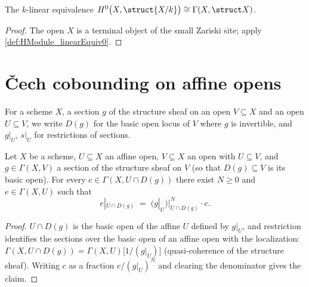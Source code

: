\begin{definition}
  \label{def:moduleKSheafHZero}
  \leanok
  The \(k\)-linear equivalence \(H^0\bigl(X, \struct{X/k}\bigr) \cong \Gamma(X, \struct X)\).
\end{definition}
\begin{proof}
  \leanok
  The open \(X\) is a terminal object of the small Zariski site; apply
  \ref{def:HModule_linearEquiv0}.
\end{proof}

\section{\v{C}ech cobounding on affine opens}

For a scheme \(X\), a section \(g\) of the structure sheaf on an open \(V \subseteq X\) and
an open \(U \subseteq V\), we write \(D(g)\) for the basic open locus of \(V\) where \(g\) is
invertible, and \(g|_U\), \(s|_U\) for restrictions of sections.

\begin{lemma}
  \label{lem:denominator_clearing}
  \leanok
  Let \(X\) be a scheme, \(U \subseteq X\) an affine open, \(V \subseteq X\) an open with
  \(U \subseteq V\), and \(g \in \Gamma(X, V)\) a section of the structure sheaf on \(V\) (so
  that \(D(g) \subseteq V\) is its basic open). For every \(c \in \Gamma(X, U \cap D(g))\)
  there exist \(N \ge 0\) and \(e \in \Gamma(X, U)\) such that
  \[
    e|_{U \cap D(g)} \;=\; \bigl(g|_{U}\bigr)|_{U \cap D(g)}^{N} \cdot c .
  \]
\end{lemma}
\begin{proof}
  \leanok
  \(U \cap D(g)\) is the basic open of the affine \(U\) defined by \(g|_U\), and restriction
  identifies the sections over the basic open of an affine open with the localization:
  \(\Gamma(X, U \cap D(g)) = \Gamma(X, U)\bigl[1/(g|_U)\bigr]\) (quasi-coherence of the
  structure sheaf). Writing \(c\) as a fraction \(e / (g|_U)^N\) and clearing the denominator
  gives the claim.
\end{proof}

